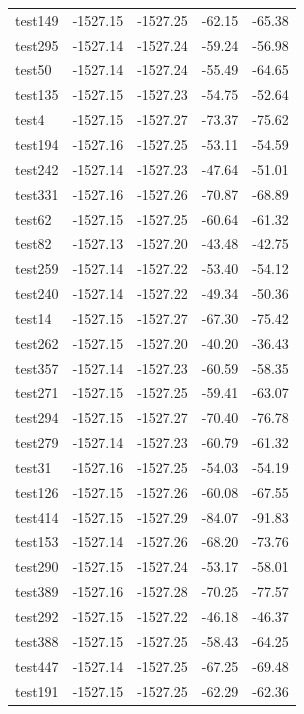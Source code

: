 \documentclass[journal=jacsat,manuscript=article]{achemso}
\begin{document}
\begin{table}[b!]
\begin{tabular}{lrrrr}
test149 &  -1527.15 &  -1527.25 &  -62.15 &  -65.38 \\
test295 &  -1527.14 &  -1527.24 &  -59.24 &  -56.98 \\
test50  &  -1527.14 &  -1527.24 &  -55.49 &  -64.65 \\
test135 &  -1527.15 &  -1527.23 &  -54.75 &  -52.64 \\
test4   &  -1527.15 &  -1527.27 &  -73.37 &  -75.62 \\
test194 &  -1527.16 &  -1527.25 &  -53.11 &  -54.59 \\
test242 &  -1527.14 &  -1527.23 &  -47.64 &  -51.01 \\
test331 &  -1527.16 &  -1527.26 &  -70.87 &  -68.89 \\
test62  &  -1527.15 &  -1527.25 &  -60.64 &  -61.32 \\
test82  &  -1527.13 &  -1527.20 &  -43.48 &  -42.75 \\
test259 &  -1527.14 &  -1527.22 &  -53.40 &  -54.12 \\
test240 &  -1527.14 &  -1527.22 &  -49.34 &  -50.36 \\
test14  &  -1527.15 &  -1527.27 &  -67.30 &  -75.42 \\
test262 &  -1527.15 &  -1527.20 &  -40.20 &  -36.43 \\
test357 &  -1527.14 &  -1527.23 &  -60.59 &  -58.35 \\
test271 &  -1527.15 &  -1527.25 &  -59.41 &  -63.07 \\
test294 &  -1527.15 &  -1527.27 &  -70.40 &  -76.78 \\
test279 &  -1527.14 &  -1527.23 &  -60.79 &  -61.32 \\
test31  &  -1527.16 &  -1527.25 &  -54.03 &  -54.19 \\
test126 &  -1527.15 &  -1527.26 &  -60.08 &  -67.55 \\
test414 &  -1527.15 &  -1527.29 &  -84.07 &  -91.83 \\
test153 &  -1527.14 &  -1527.26 &  -68.20 &  -73.76 \\
test290 &  -1527.15 &  -1527.24 &  -53.17 &  -58.01 \\
test389 &  -1527.16 &  -1527.28 &  -70.25 &  -77.57 \\
test292 &  -1527.15 &  -1527.22 &  -46.18 &  -46.37 \\
test388 &  -1527.15 &  -1527.25 &  -58.43 &  -64.25 \\
test447 &  -1527.14 &  -1527.25 &  -67.25 &  -69.48 \\
test191 &  -1527.15 &  -1527.25 &  -62.29 &  -62.36 \\

\end{tabular}
\end{table}
\end{document}
